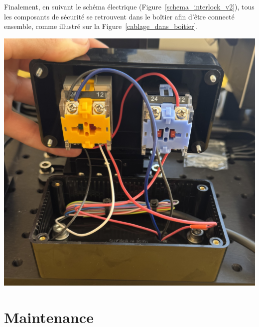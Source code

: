 \begin{minipage}[c]{0.48\textwidth}
    Finalement, en suivant le schéma électrique (Figure~\ref{schema_interlock_v2}), tous les composants de sécurité se retrouvent dans le boîtier afin d'être connecté ensemble, comme illustré sur la Figure~\ref{cablage_dans_boitier}.
\end{minipage}\hfill
\begin{minipage}[c]{0.48\textwidth}
    \begin{center}
        \includegraphics[width=\textwidth]{assets/figures/Protections_laser/Securite_electrique/cablage_dans_boitier.jpeg}
    \end{center}
    \label{cablage_dans_boitier}
\end{minipage}

\section{Maintenance} \label{section:maintenance}

